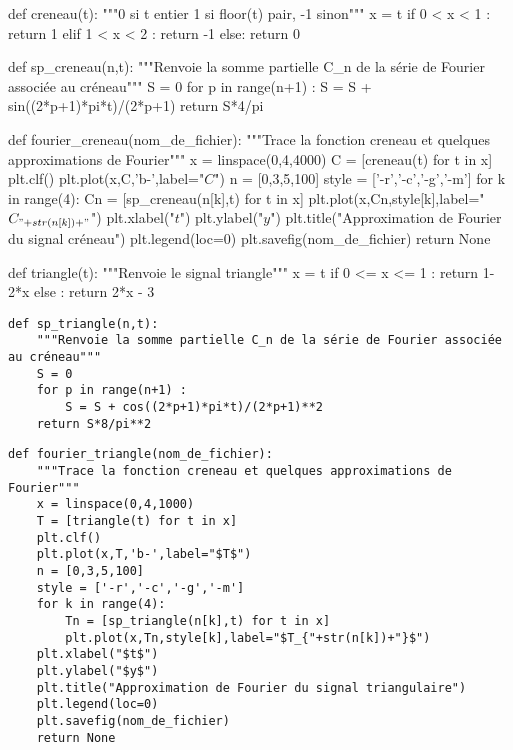 \question{}
\begin{pyverbatim}
def creneau(t):
    """0 si t entier
       1 si floor(t) pair, -1 sinon"""
    x = t%
    if 0 < x < 1 : 
        return 1
    elif 1 < x < 2 : 
        return -1
    else:
        return 0
\end{pyverbatim}
\question{}
\begin{pyverbatim}
def sp_creneau(n,t):
    """Renvoie la somme partielle C_n de la série de Fourier associée au créneau"""
    S = 0
    for p in range(n+1) : 
        S = S + sin((2*p+1)*pi*t)/(2*p+1)
    return S*4/pi
\end{pyverbatim}
\question{}
\begin{pyverbatim}
def fourier_creneau(nom_de_fichier):
    """Trace la fonction creneau et quelques approximations de Fourier"""
    x = linspace(0,4,4000)
    C = [creneau(t) for t in x]
    plt.clf()
    plt.plot(x,C,'b-',label="$C$")
    n = [0,3,5,100]
    style = ['-r','-c','-g','-m']
    for k in range(4):
        Cn = [sp_creneau(n[k],t) for t in x]
        plt.plot(x,Cn,style[k],label="$C_{"+str(n[k])+"}$")
    plt.xlabel("$t$")
    plt.ylabel("$y$")
    plt.title("Approximation de Fourier du signal créneau")
    plt.legend(loc=0)
    plt.savefig(nom_de_fichier)
    return None
\end{pyverbatim}
\question{}
\begin{pyverbatim}
def triangle(t):
    """Renvoie le signal triangle"""
    x = t %
    if 0 <= x <= 1 :
        return 1-2*x
    else : 
        return 2*x - 3 
\end{pyverbatim}
\question{}
\begin{lstlisting}
def sp_triangle(n,t):
    """Renvoie la somme partielle C_n de la série de Fourier associée au créneau"""
    S = 0
    for p in range(n+1) : 
        S = S + cos((2*p+1)*pi*t)/(2*p+1)**2
    return S*8/pi**2 
\end{lstlisting}
\question{}
\begin{lstlisting}
def fourier_triangle(nom_de_fichier):
    """Trace la fonction creneau et quelques approximations de Fourier"""
    x = linspace(0,4,1000)
    T = [triangle(t) for t in x]
    plt.clf()
    plt.plot(x,T,'b-',label="$T$")
    n = [0,3,5,100]
    style = ['-r','-c','-g','-m']
    for k in range(4):
        Tn = [sp_triangle(n[k],t) for t in x]
        plt.plot(x,Tn,style[k],label="$T_{"+str(n[k])+"}$")
    plt.xlabel("$t$")
    plt.ylabel("$y$")
    plt.title("Approximation de Fourier du signal triangulaire")
    plt.legend(loc=0)
    plt.savefig(nom_de_fichier)
    return None
\end{lstlisting}